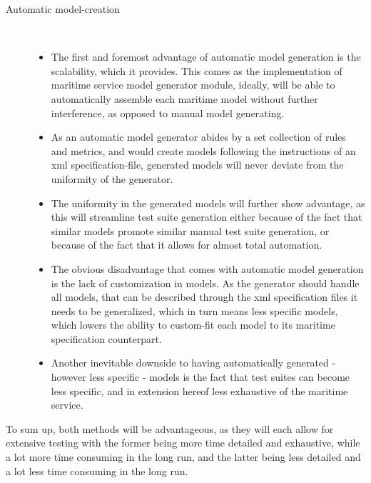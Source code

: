 \begin{description}
\begin{itemize}
		\end{itemize}
	\item[Automatic model-creation]\ \\
		\begin{itemize}
			\item The first and foremost advantage of automatic model generation is the scalability, which it provides. This comes as the implementation of  maritime service model generator module, ideally, will be able to automatically assemble each maritime model without further interference, as opposed to manual model generating.
			\item As an automatic model generator abides by a set collection of rules and metrics, and would create models following the instructions of an xml specification-file, generated models will never deviate from the uniformity of the generator.
			\item The uniformity in the generated models will further show advantage, as this will streamline test suite generation either because of the fact that similar models promote similar manual test suite generation, or because of the fact that it allows for almost total automation.
		\end{itemize}
		\begin{itemize}
			\item The obvious disadvantage that comes with automatic model generation is the lack of customization in models. As the generator should handle all models, that can be described through the xml specification files it needs to be generalized, which in turn means less specific models, which lowers the ability to custom-fit each model to its maritime specification counterpart.
			\item Another inevitable downside to having automatically generated - however less specific - models is the fact that test suites can become less specific, and in extension hereof less exhaustive of the maritime service.
	\end{itemize}
\end{description}

To sum up, both methods will be advantageous, as they will each allow for extensive testing with the former being more time detailed and exhaustive, while a lot more time consuming in the long run, and the latter being less detailed and a lot less time consuming in the long run.